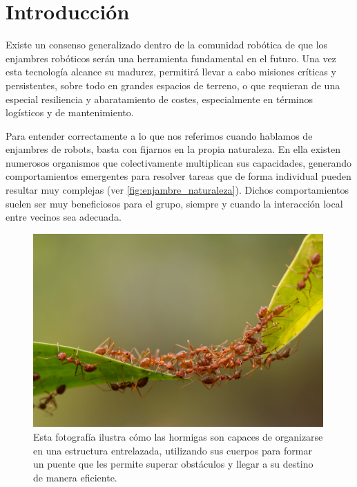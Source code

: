 
\section{Introducción}

Existe un consenso generalizado dentro de la comunidad robótica de que los enjambres robóticos serán una herramienta fundamental en el futuro. Una vez esta tecnología alcance su madurez, permitirá llevar a cabo misiones críticas y persistentes, sobre todo en grandes espacios de terreno, o que requieran de una especial resiliencia y abaratamiento de costes, especialmente en términos logísticos y de mantenimiento.

Para entender correctamente a lo que nos referimos cuando hablamos de enjambres de robots, basta con fijarnos en la propia naturaleza. En ella existen numerosos organismos que colectivamente multiplican sus capacidades, generando comportamientos emergentes para resolver tareas que de forma individual pueden resultar muy complejas (ver \autoref{fig:enjambre_naturaleza}). Dichos comportamientos suelen ser muy beneficiosos para el grupo, siempre y cuando la interacción local entre vecinos sea adecuada.

\begin{figure}[h]
    \centering
    \includegraphics[trim={0 0cm 0 5cm}, clip, width=0.99\textwidth]{fig/0_ant-bridge.jpg}
    \caption{Esta fotografía ilustra cómo las hormigas son capaces de organizarse en una estructura entrelazada, utilizando sus cuerpos para formar un puente que les permite superar obstáculos y llegar a su destino de manera eficiente.}
    \label{fig:enjambre_naturaleza}
\end{figure}

